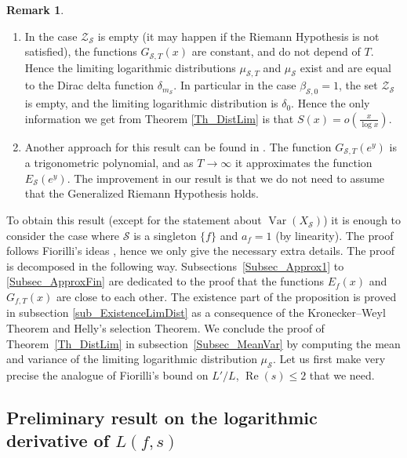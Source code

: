 \documentclass[a4paper,10pt]{amsart}
\theoremstyle{plain}
\theoremstyle{definition}
\newtheorem{Rk}{Remark}
\begin{document}
\begin{Rk}\label{Rk_onProp_LimOfDist}
\begin{enumerate}
\item\label{It_NoZero} In the case $\mathcal{Z}_{\mathcal{S}}$ is empty (it may happen if the Riemann Hypothesis is not satisfied), the functions $G_{\mathcal{S},T}(x)$ are constant, and do not depend of $T$. 
Hence the limiting logarithmic distributions $\mu_{\mathcal{S},T}$ and $\mu_{\mathcal{S}}$ exist and are equal to the Dirac delta function $\delta_{m_{\mathcal{S}}}$.
In particular in the case $\beta_{\mathcal{S},0}=1$, the set $\mathcal{Z}_{\mathcal{S}}$ is empty, and the limiting logarithmic distribution is $\delta_{0}$. 
Hence the only information we get from Theorem \ref{Th_DistLim} is that $S(x) = o\left(\frac{x}{\log x}\right)$.
\item Another approach for this result can be found in \cite{ANS}.
The function $G_{\mathcal{S},T}(e^{y})$ is a trigonometric polynomial, 
and as $T\rightarrow\infty$ it approximates the function $E_{\mathcal{S}}(e^{y})$.
The improvement in our result is that we do not need to assume that the Generalized Riemann Hypothesis holds.
\end{enumerate}
\end{Rk}

To obtain this result (except for the statement about $\operatorname{Var}(X_{\mathcal{S}})$) 
it is enough to consider the case where $\mathcal{S}$ is a singleton $\lbrace f\rbrace$ and $a_{f}=1$ (by linearity).
The proof follows Fiorilli's ideas \cite[Lem. 3.4]{FioEC},
hence we only give the necessary extra details.
The proof is decomposed in the following way.
Subsections~\ref{Subsec_Approx1} to \ref{Subsec_ApproxFin} are dedicated to the proof that 
the functions $E_{f}(x)$ and $G_{f,T}(x)$ are close to each other.
The existence part of the proposition is proved in subsection \ref{sub_ExistenceLimDist} as a consequence of the Kronecker--Weyl Theorem and Helly's selection Theorem.
We conclude the proof of Theorem~\ref{Th_DistLim} in subsection~\ref{Subsec_MeanVar} by computing the mean and variance of the limiting logarithmic distribution $\mu_{\mathcal{S}}$.
Let us first make very precise the analogue of Fiorilli's bound on $L'/L$, $\operatorname{Re}(s)\leq 2$ that we need.

\subsection{Preliminary result on the logarithmic derivative of $L(f,s)$}\label{Sec_boundlogder}
\end{document}
